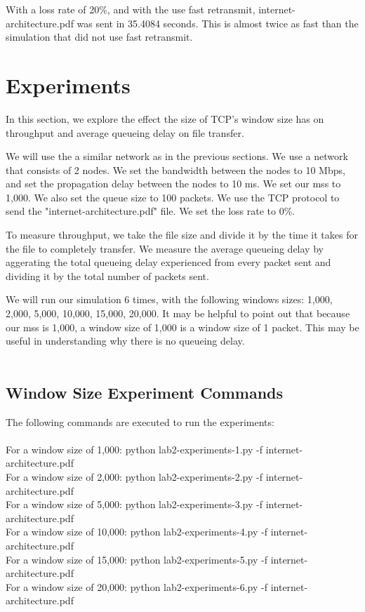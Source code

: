 \documentclass[fleqn,11pt]{article}
\begin{document}
With a loss rate of 20\%,  and with the use fast retransmit, internet-architecture.pdf was sent in 35.4084 seconds. This is almost twice as fast than the simulation that did not use fast retransmit.

\section{Experiments}
In this section, we explore the effect the size of TCP's window size has on throughput and average queueing delay on file transfer. 

We will use the a similar network as in the previous sections. We use a network that consists of 2 nodes. We set the bandwidth between the nodes to 10 Mbps, and set the propagation delay between the nodes to 10 ms. We set our mss to 1,000. We also set the queue size to 100 packets. We use the TCP protocol to send the "internet-architecture.pdf" file. We set the loss rate to 0\%.

To measure throughput, we take the file size and divide it by the time it takes for the file to completely transfer. We measure the average queueing delay by aggerating the total queueing delay experienced from every packet sent and dividing it by the total number of packets sent. 

We will run our simulation 6 times, with the following windows sizes: 1,000, 2,000, 5,000, 10,000, 15,000, 20,000. It may be helpful to point out that because our mss is 1,000, a window size of 1,000 is a window size of 1 packet. This may be useful in understanding why there is no queueing delay.\\\\
\subsection{Window Size Experiment Commands}
The following commands are executed to run the experiments: \\\\
For a window size of 1,000: python lab2-experiments-1.py -f internet-architecture.pdf\\
For a window size of 2,000: python lab2-experiments-2.py -f internet-architecture.pdf\\
For a window size of 5,000: python lab2-experiments-3.py -f internet-architecture.pdf\\
For a window size of 10,000: python lab2-experiments-4.py -f internet-architecture.pdf\\
For a window size of 15,000: python lab2-experiments-5.py -f internet-architecture.pdf\\
For a window size of 20,000: python lab2-experiments-6.py -f internet-architecture.pdf\\
\end{document}

